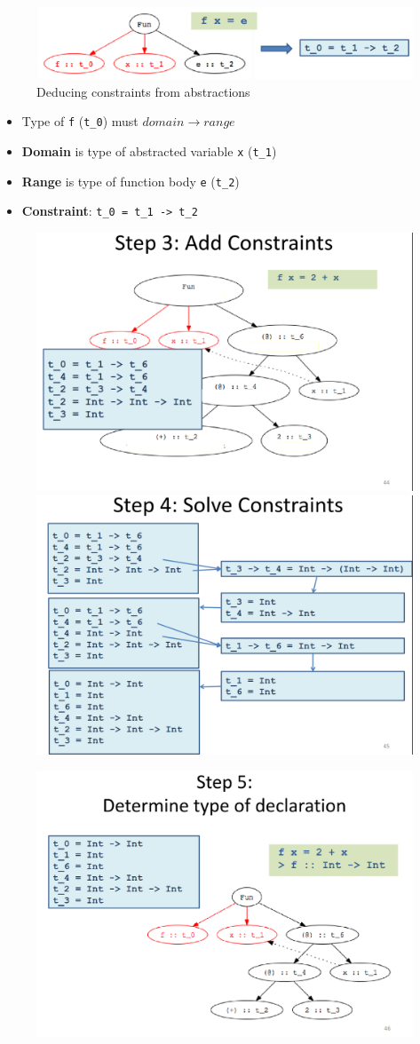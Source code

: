 \begin{figure}[htbp]
   \centering
   \includegraphics{images/typeinference_constraints_abstraction.png}
   \caption{Deducing constraints from abstractions}
   \label{fig:typeinference_constraints_abstraction}
\end{figure}

\begin{itemize}
   \item Type of \lstinline|f| (\lstinline|t_0|) must $domain \longrightarrow range$
   \item \textbf{Domain} is type of abstracted variable \lstinline|x| (\lstinline|t_1|)
   \item \textbf{Range} is type of function body \lstinline|e| (\lstinline|t_2|)
   \item \textbf{Constraint}: \lstinline|t_0 = t_1 -> t_2|
\end{itemize}

\begin{figure}[htbp]
   \centering
   \includegraphics[width=0.4\columnwidth]{images/typeinference_step3.png}
   \includegraphics[width=0.4\columnwidth]{images/typeinference_step4.png}
   \label{fig:typeinference_step3_4}
\end{figure}

\begin{figure}[htbp]
   \centering
   \includegraphics[width=0.4\columnwidth]{images/typeinference_step5.png}
   \label{fig:typeinference_step5}
\end{figure}

